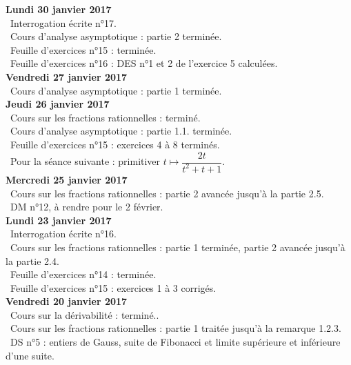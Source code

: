 \documentclass[12pt,a4paper]{article}
\begin{document}
\noindent\textbf{Lundi 30 janvier 2017}\\
\bu\ Interrogation écrite n°17.\\
\bu\ Cours d'analyse asymptotique : partie 2 terminée.\\
\bu\ Feuille d'exercices n°15 : terminée.\\
\bu\ Feuille d'exercices n°16 : DES n°1 et 2 de l'exercice 5 calculées.\vspace{.4cm}\\

\noindent\textbf{Vendredi 27 janvier 2017}\\
\bu\ Cours d'analyse asymptotique : partie 1 terminée. \vspace{.4cm}\\

\noindent\textbf{Jeudi 26 janvier 2017}\\
\bu\ Cours sur les fractions rationnelles : terminé.\\
\bu\ Cours d'analyse asymptotique : partie 1.1. terminée.\\
\bu\ Feuille d'exercices n°15 : exercices 4 à 8 terminés.\\
\bu\ Pour la séance suivante : primitiver $t\mapsto \dfrac{2t}{t^2+t+1}$.\vspace{.4cm}\\


\noindent\textbf{Mercredi 25 janvier 2017}\\
\bu\ Cours sur les fractions rationnelles : partie 2 avancée jusqu'à la partie 2.5.\\
\bu\ DM n°12, à rendre pour le 2 février.\vspace{.4cm}\\

\noindent\textbf{Lundi 23 janvier 2017}\\
\bu\ Interrogation écrite n°16.\\
\bu\ Cours sur les fractions rationnelles : partie 1 terminée, partie 2 avancée jusqu'à la partie 2.4.\\
\bu\ Feuille d'exercices n°14 : terminée.\\
\bu\ Feuille d'exercices n°15 : exercices 1 à 3 corrigés.\vspace{.4cm}\\

\noindent\textbf{Vendredi 20 janvier 2017}\\
\bu\ Cours sur la dérivabilité : terminé..\\
\bu\ Cours sur les fractions rationnelles : partie 1 traitée jusqu'à la remarque 1.2.3.\\
\bu\ DS n°5 : entiers de Gauss, suite de Fibonacci et limite supérieure et inférieure d'une suite.\vspace{.4cm}\\
\end{document}
